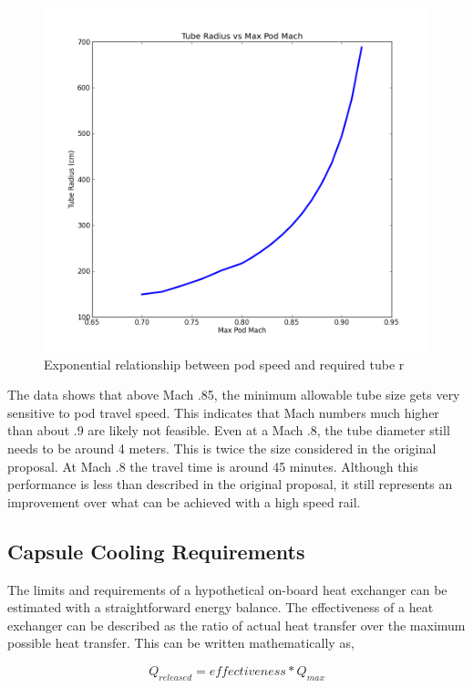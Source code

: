 \documentclass[heading.tex]{subfiles}
\begin{document}
\begin{figure}[hbtp]
\centering
\includegraphics[scale=0.5]{images/mach_vs_rad.png}
\caption{Exponential relationship between pod speed and required tube r}
\label{f:machRAD}
\end{figure}

The data shows that above Mach .85, the minimum allowable tube size gets very sensitive to pod travel speed. This indicates that Mach
numbers much higher than about .9 are likely not feasible. Even at a Mach .8, the tube diameter still needs to be around 4 meters. This is
twice the size considered in the original proposal. At Mach .8 the travel time is around 45 minutes. Although this performance is less than
described in the original proposal, it still represents an improvement over what can be achieved with a high speed rail.

\subsection{Capsule Cooling Requirements}
The limits and requirements of a hypothetical on-board heat exchanger can be estimated with a straightforward energy balance. The
effectiveness of a heat exchanger can be described as the ratio of actual heat transfer over the maximum possible heat transfer. This can
be written mathematically as,

\begin{equation*}
{Q}_{released}  = effectiveness * {Q}_{max}
\end{equation*}
\end{document}
